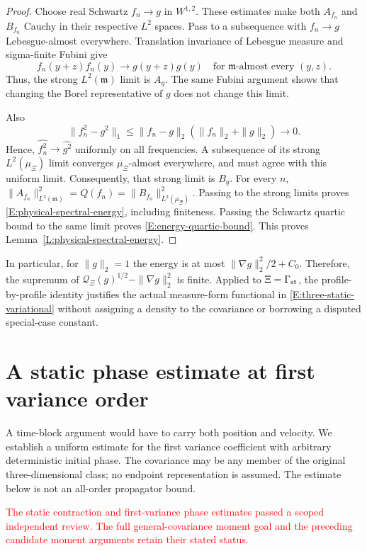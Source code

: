 \documentclass[12pt]{article}
\numberwithin{equation}{section}
\theoremstyle{definition}
\newcommand{\myCmts}[1]{\begin{framed}\noindent\textcolor{red}{#1}\end{framed}}
\begin{document}
\begin{proof}
  Choose real Schwartz $f_n\to g$ in $W^{1,2}$.
  These estimates make both $A_{f_n}$ and $B_{f_n}$ Cauchy in
  their respective $L^2$ spaces. Pass to a subsequence with
  $f_n\to g$ Lebesgue-almost everywhere.
  Translation invariance of Lebesgue measure and sigma-finite Fubini give
  \[
    f_n(y+z)f_n(y)\longrightarrow g(y+z)g(y)
    \quad\text{for }\mathfrak m\text{-almost every }(y,z).
  \]
  Thus, the strong $L^2(\mathfrak m)$ limit is $A_g$.
  The same Fubini argument shows that changing the Borel
  representative of $g$ does not change this limit.

  Also
  \[
    \|f_n^2-g^2\|_1
    \le\|f_n-g\|_2(\|f_n\|_2+\|g\|_2)\longrightarrow0.
  \]
  Hence, $\widehat{f_n^2}\to\widehat{g^2}$ uniformly on all
  frequencies. A subsequence of its strong $L^2(\mu_\Xi)$ limit
  converges $\mu_\Xi$-almost everywhere, and must agree with this
  uniform limit. Consequently, that strong limit is $B_g$.
  For every $n$,
  $\|A_{f_n}\|_{L^2(\mathfrak m)}^2
  =Q(f_n)=\|B_{f_n}\|_{L^2(\mu_\Xi)}^2$.
  Passing to the strong limits proves
  \eqref{E:physical-spectral-energy}, including finiteness.
  Passing the Schwartz quartic bound to the same limit proves
  \eqref{E:energy-quartic-bound}.
  This proves Lemma~\ref{L:physical-spectral-energy}.
\end{proof}

In particular, for $\|g\|_2=1$ the energy is at most
$\|\nabla g\|_2^2/2+C_0$. Therefore, the supremum of
$\mathcal Q_\Xi(g)^{1/2}-\|\nabla g\|_2^2$ is finite.
Applied to $\Xi=\Gamma_{\rm st}$, the profile-by-profile identity
justifies the actual measure-form functional in
\eqref{E:three-static-variational} without assigning a density to
the covariance or borrowing a disputed special-case constant.

\section{A static phase estimate at first variance order}
\label{S:static-phase}

A time-block argument would have to carry both position and velocity.
We establish a uniform estimate for the first variance coefficient with
arbitrary deterministic initial phase. The covariance may be any member
of the original three-dimensional class; no endpoint representation is
assumed. The estimate below is not an all-order propagator bound.

\myCmts{The static contraction and first-variance phase estimates
passed a scoped independent review.
The full general-covariance moment goal and the preceding candidate
moment arguments retain their stated status.}
\end{document}
